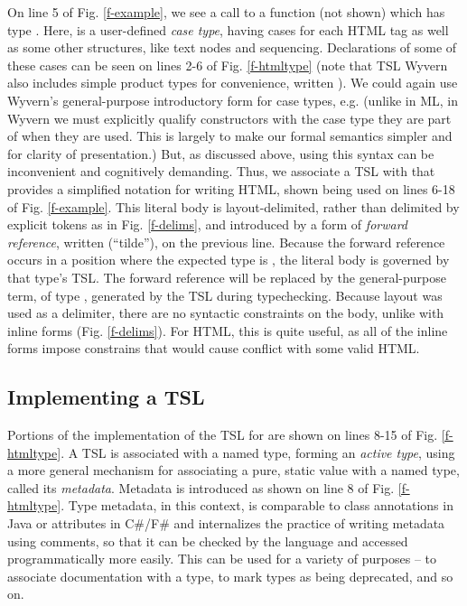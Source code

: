 On line 5 of Fig. \ref{f-example}, we see a call to a function  (not shown) which has type . Here,  is a user-defined \emph{case type}, having cases for each HTML tag as well as some other structures, like text nodes and sequencing. Declarations  of some of these cases can be seen on lines 2-6 of Fig. \ref{f-htmltype} (note that TSL Wyvern also includes simple product types for convenience, written ). We could again use Wyvern's general-purpose introductory form for case types, e.g.  ({unlike in ML, in Wyvern we must explicitly qualify constructors with the case type they are part of when they are used}. This is largely to make our formal semantics simpler and for clarity of presentation.) But, as discussed above, using this syntax can be inconvenient and  cognitively demanding. Thus, we associate a TSL with  that provides a simplified notation for writing HTML, shown being used on lines 6-18 of Fig. \ref{f-example}. This literal body is layout-delimited, rather than delimited by explicit tokens as in Fig. \ref{f-delims}, and introduced by a form of \emph{forward reference}, written \li{~} (``tilde''), on the previous line. Because the forward reference occurs in a position where the expected type is , the literal body is governed by that type's TSL. The forward reference will be replaced by the general-purpose term, of type , generated by the TSL during typechecking. Because layout was used as a delimiter, there are no syntactic constraints on the body, unlike with inline forms (Fig. \ref{f-delims}). For HTML, this is quite useful, as all of the inline forms impose constrains that would cause conflict with some valid HTML.
\subsection{Implementing a TSL}
Portions of the implementation of the TSL for  are shown on lines 8-15 of Fig. \ref{f-htmltype}. A TSL is associated with a named type, forming an \emph{active type}, using a more general mechanism for associating a pure, static value with a named type, called its \emph{metadata}. Metadata is introduced as shown on line 8 of Fig. \ref{f-htmltype}. Type metadata, in this context, is comparable to class annotations in Java or attributes in C\#/F\# and internalizes the practice of writing metadata using comments, so that it can be checked by the language and accessed programmatically more easily. This can be used for a variety of purposes -- to associate documentation with a type, to mark types as being deprecated, and so on.

